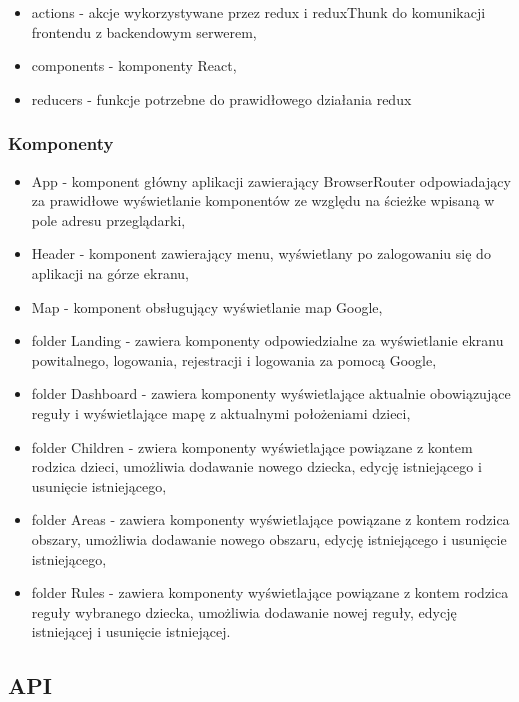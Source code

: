 \documentclass{sprawozdanie-agh}
\begin{document}
				\begin{itemize}
					\item actions - akcje wykorzystywane przez redux i reduxThunk do komunikacji frontendu z backendowym serwerem,
					\item components - komponenty React,
					\item reducers - funkcje potrzebne do prawidłowego działania redux
				\end{itemize}

			\subsubsection{Komponenty}

				\begin{itemize}
					\item App - komponent główny aplikacji zawierający BrowserRouter odpowiadający za prawidłowe wyświetlanie komponentów ze względu na ścieżke wpisaną w pole adresu przeglądarki,
					\item Header - komponent zawierający menu, wyświetlany po zalogowaniu się do aplikacji na górze ekranu,
					\item Map - komponent obsługujący wyświetlanie map Google,
					\item folder Landing - zawiera komponenty odpowiedzialne za wyświetlanie ekranu powitalnego, logowania, rejestracji i logowania za pomocą Google,
					\item folder Dashboard - zawiera komponenty wyświetlające aktualnie obowiązujące reguły i wyświetlające mapę z aktualnymi położeniami dzieci,
					\item folder Children - zwiera komponenty wyświetlające powiązane z kontem rodzica dzieci, umożliwia dodawanie nowego dziecka, edycję istniejącego i usunięcie istniejącego,
					\item folder Areas - zawiera komponenty wyświetlające powiązane z kontem rodzica obszary, umożliwia dodawanie nowego obszaru, edycję istniejącego i usunięcie istniejącego,
					\item folder Rules - zawiera komponenty wyświetlające powiązane z kontem rodzica reguły wybranego dziecka, umożliwia dodawanie nowej reguły, edycję istniejącej i usunięcie istniejącej.
				\end{itemize}

		\subsection{API}
\end{document}
